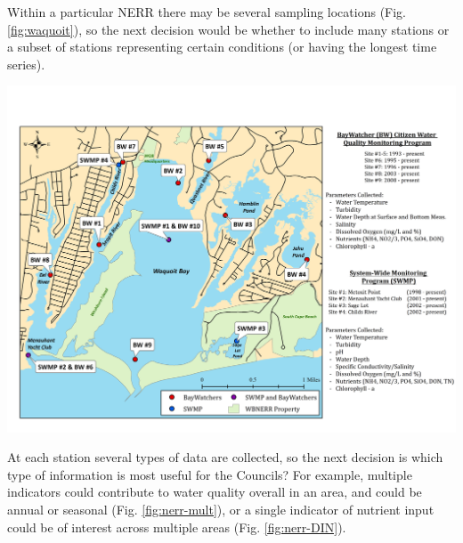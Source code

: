 \documentclass[
  10pt,
]{article}
\let\origfigure\figure
\let\endorigfigure\endfigure
\renewenvironment{figure}[1][2] {
    \expandafter\origfigure\expandafter[H]
} {
    \endorigfigure
}
\begin{document}
Within a particular NERR there may be several sampling locations (Fig.
\ref{fig:waquoit}), so the next decision would be whether to include
many stations or a subset of stations representing certain conditions
(or having the longest time series).

\begin{figure}

{\centering \includegraphics[width=0.95\linewidth]{images/Waquoit_Map} 

}

\caption{Waquit Bay National Estuarine Research Reserve map with sampling locations.}\label{fig:waquoit}
\end{figure}

At each station several types of data are collected, so the next
decision is which type of information is most useful for the Councils?
For example, multiple indicators could contribute to water quality
overall in an area, and could be annual or seasonal (Fig.
\ref{fig:nerr-mult}), or a single indicator of nutrient input could be
of interest across multiple areas (Fig. \ref{fig:nerr-DIN}).
\end{document}
